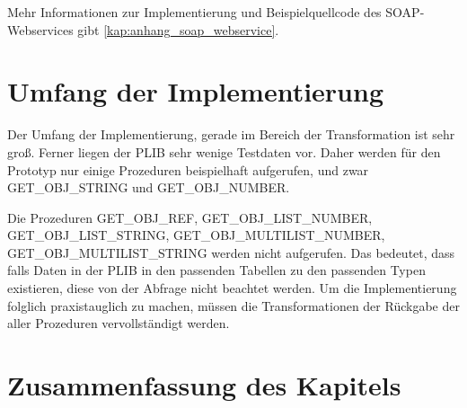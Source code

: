 Mehr Informationen zur Implementierung und Beispielquellcode des \gls{SOAP}-\glspl{Webservice} gibt \autoref{kap:anhang_soap_webservice}. 

\section{Umfang der Implementierung}

Der Umfang der Implementierung, gerade im Bereich der Transformation ist sehr groß. Ferner liegen der \gls{PLIB} sehr wenige Testdaten vor. Daher werden für den Prototyp nur einige Prozeduren beispielhaft aufgerufen, und zwar GET\_OBJ\_STRING und GET\_OBJ\_NUMBER. 

Die Prozeduren GET\_OBJ\_REF, GET\_OBJ\_LIST\_NUMBER, GET\_OBJ\_LIST\_STRING, GET\_OBJ\_MULTILIST\_NUMBER, GET\_OBJ\_MULTILIST\_STRING werden nicht aufgerufen. Das bedeutet, dass falls Daten in der \gls{PLIB} in den passenden Tabellen zu den passenden Typen existieren, diese von der Abfrage nicht beachtet werden. Um die Implementierung folglich praxistauglich zu machen, müssen die Transformationen der Rückgabe der aller Prozeduren vervollständigt werden. 
 
\section{Zusammenfassung des Kapitels}

